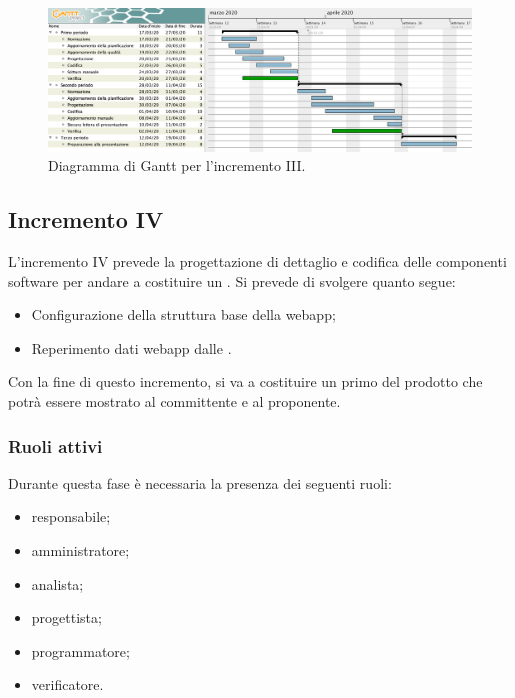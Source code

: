 		\begin{landscape}
          \begin{figure}[H]
            \centering
            \includegraphics[width=\linewidth]{images/ganttDettaglioCodifica} %
            \caption{Diagramma di Gantt per l'incremento III.}
          \end{figure}		
		\end{landscape}


		\subsection{Incremento IV}
			
			L'incremento IV prevede la progettazione di dettaglio e codifica delle componenti software per andare a costituire un . Si prevede di svolgere quanto segue:
			\begin{itemize}
				\item Configurazione della struttura base della webapp;
				\item Reperimento dati webapp dalle .
			\end{itemize}
			Con la fine di questo incremento, si va a costituire un primo  del prodotto che potrà essere mostrato al committente e al proponente.
			
			\subsubsection{Ruoli attivi}
			
				Durante questa fase è necessaria la presenza dei seguenti ruoli:
				\begin{itemize}
					\item responsabile;
					\item amministratore;
					\item analista;
					\item progettista;
					\item programmatore;
					\item verificatore.
				\end{itemize}
			
